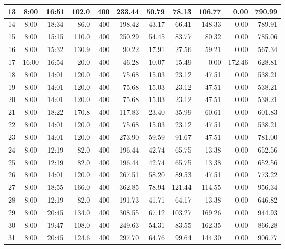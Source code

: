 \begin{landscape}
\begin{longtable}{|c|c|c|r|r|r|r|r|r|r|r|}
\hline
\rowcolor{gray!8}
13 & 8:00 & 16:51 & 102.0 & 400 & 233.44 & 50.79 & 78.13 & 106.77 & 0.00 & 790.99 \\
\hline
14 & 8:00 & 18:34 & 86.0 & 400 & 198.42 & 43.17 & 66.41 & 148.33 & 0.00 & 789.91 \\
\hline
\rowcolor{gray!8}
15 & 8:00 & 15:15 & 110.0 & 400 & 250.29 & 54.45 & 83.77 & 80.32 & 0.00 & 785.06 \\
\hline
16 & 8:00 & 15:32 & 130.9 & 400 & 90.22 & 17.91 & 27.56 & 59.21 & 0.00 & 567.34 \\
\hline
\rowcolor{gray!8}
17 & 16:00 & 16:54 & 20.0 & 400 & 46.28 & 10.07 & 15.49 & 0.00 & 172.46 & 628.81 \\
\hline
18 & 8:00 & 14:01 & 120.0 & 400 & 75.68 & 15.03 & 23.12 & 47.51 & 0.00 & 538.21 \\
\hline
\rowcolor{gray!8}
19 & 8:00 & 14:01 & 120.0 & 400 & 75.68 & 15.03 & 23.12 & 47.51 & 0.00 & 538.21 \\
\hline
20 & 8:00 & 14:01 & 120.0 & 400 & 75.68 & 15.03 & 23.12 & 47.51 & 0.00 & 538.21 \\
\hline
\rowcolor{gray!8}
21 & 8:00 & 18:22 & 170.8 & 400 & 117.83 & 23.40 & 35.99 & 60.61 & 0.00 & 601.83 \\
\hline
22 & 8:00 & 14:01 & 120.0 & 400 & 75.68 & 15.03 & 23.12 & 47.51 & 0.00 & 538.21 \\
\hline
\rowcolor{gray!8}
23 & 8:00 & 14:01 & 120.0 & 400 & 273.90 & 59.59 & 91.67 & 47.51 & 0.00 & 781.00 \\
\hline
24 & 8:00 & 12:19 & 82.0 & 400 & 196.44 & 42.74 & 65.75 & 13.38 & 0.00 & 652.56 \\
\hline
\rowcolor{gray!8}
25 & 8:00 & 12:19 & 82.0 & 400 & 196.44 & 42.74 & 65.75 & 13.38 & 0.00 & 652.56 \\
\hline
26 & 8:00 & 14:01 & 120.0 & 400 & 267.51 & 58.20 & 89.53 & 47.51 & 0.00 & 773.22 \\
\hline
\rowcolor{gray!8}
27 & 8:00 & 18:55 & 166.0 & 400 & 362.85 & 78.94 & 121.44 & 114.55 & 0.00 & 956.34 \\
\hline
28 & 8:00 & 12:19 & 82.0 & 400 & 191.73 & 41.71 & 64.17 & 13.38 & 0.00 & 646.82 \\
\hline
\rowcolor{gray!8}
29 & 8:00 & 20:45 & 134.0 & 400 & 308.55 & 67.12 & 103.27 & 169.26 & 0.00 & 944.93 \\
\hline
30 & 8:00 & 19:47 & 108.0 & 400 & 249.63 & 54.31 & 83.55 & 162.35 & 0.00 & 866.28 \\
\hline
\rowcolor{gray!8}
31 & 8:00 & 20:45 & 124.6 & 400 & 297.70 & 64.76 & 99.64 & 144.30 & 0.00 & 906.77 \\

\end{longtable}
\end{landscape}
